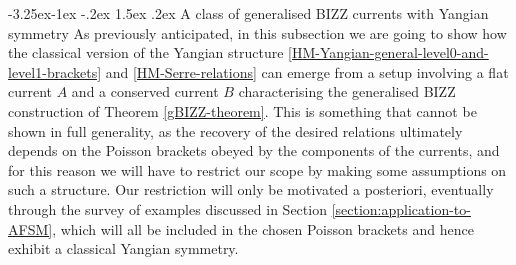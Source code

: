 \documentclass[12pt]{article}
\makeatletter
\renewcommand\subsection{\@startsection{subsection}{2}{\z@}%
                                     {-3.25ex\@plus -1ex \@minus -.2ex}%
                                     {1.5ex \@plus .2ex}%
                                     {\normalfont\bfseries}}
\numberwithin{equation}{section}
\makeatother
\begin{document}
\subsection{A class of generalised BIZZ currents with Yangian symmetry}\label{subsec:Yangian-theorem}
As previously anticipated, in this subsection we are going to show how the classical version of the Yangian structure \eqref{HM-Yangian-general-level0-and-level1-brackets} and \eqref{HM-Serre-relations} can emerge from a setup involving a flat current $A$ and a conserved current $B$ characterising the generalised BIZZ construction of Theorem \ref{gBIZZ-theorem}. This is something that cannot be shown in full generality, as the recovery of the desired relations ultimately depends on the Poisson brackets obeyed by the components of the currents, and for this reason we will have to restrict our scope by making some assumptions on such a structure.
Our restriction will only be motivated a posteriori, eventually through the survey of examples discussed in Section \ref{section:application-to-AFSM}, which will all be included in the chosen Poisson brackets and hence exhibit a classical Yangian symmetry.
\end{document}
